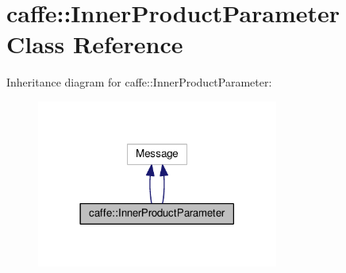 \hypertarget{classcaffe_1_1_inner_product_parameter}{}\section{caffe\+:\+:Inner\+Product\+Parameter Class Reference}
\label{classcaffe_1_1_inner_product_parameter}


Inheritance diagram for caffe\+:\+:Inner\+Product\+Parameter\+:
\nopagebreak
\begin{figure}[H]
\begin{center}
\leavevmode
\includegraphics[width=225pt]{classcaffe_1_1_inner_product_parameter__inherit__graph}
\end{center}
\end{figure}
